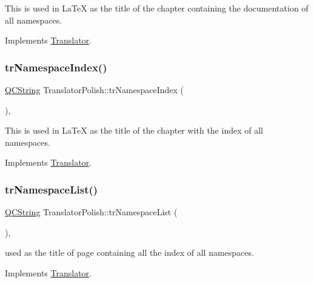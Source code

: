 This is used in La\+TeX as the title of the chapter containing the documentation of all namespaces. 

Implements \mbox{\hyperlink{class_translator}{Translator}}.

\mbox{\label{class_translator_polish_a0502d51337eb975b337ae7ec579fd23d}} 
\subsubsection{\texorpdfstring{trNamespaceIndex()}{trNamespaceIndex()}}
{\footnotesize\ttfamily \mbox{\hyperlink{class_q_c_string}{Q\+C\+String}} Translator\+Polish\+::tr\+Namespace\+Index (\begin{DoxyParamCaption}{ }\end{DoxyParamCaption})\hspace{0.3cm}{\ttfamily [inline]}, {\ttfamily [virtual]}}

This is used in La\+TeX as the title of the chapter with the index of all namespaces. 

Implements \mbox{\hyperlink{class_translator}{Translator}}.

\mbox{\label{class_translator_polish_a5a4beabb336dbbb60ca4673bcac08b7f}} 
\subsubsection{\texorpdfstring{trNamespaceList()}{trNamespaceList()}}
{\footnotesize\ttfamily \mbox{\hyperlink{class_q_c_string}{Q\+C\+String}} Translator\+Polish\+::tr\+Namespace\+List (\begin{DoxyParamCaption}{ }\end{DoxyParamCaption})\hspace{0.3cm}{\ttfamily [inline]}, {\ttfamily [virtual]}}

used as the title of page containing all the index of all namespaces. 

Implements \mbox{\hyperlink{class_translator}{Translator}}.

\mbox{\label{class_translator_polish_a3a8f74b8c29e0b30a9141b8c429745c3}} 
